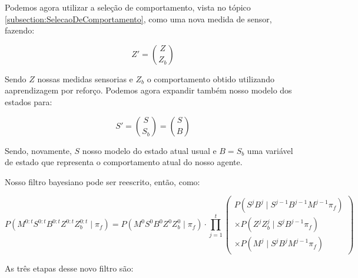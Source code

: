 Podemos agora utilizar a seleção de comportamento, vista no tópico \ref{subsection:SelecaoDeComportamento}, como uma nova medida de sensor, fazendo:

\begin{equation}
	Z' = \binom{Z}{Z_b}
\end{equation}

Sendo $ Z $ nossas medidas sensorias e $ Z_b $ o comportamento obtido utilizando aaprendizagem por reforço. Podemos agora expandir também nosso modelo dos estados para:

\begin{equation}
	S' = \binom{S}{S_b} = \binom{S}{B}
\end{equation}

Sendo, novamente, $ S $ nosso modelo do estado atual usual e $ B = S_b $ uma variável de estado que representa o comportamento atual do nosso agente.

Nosso filtro bayesiano pode ser reescrito, então, como:

\begin{equation}
        P \left( M^{0: t} S^{0: t} B^{0: t} Z^{0: t} Z_b^{0: t} \mid \pi_f \right) = P \left( M^0 S^0 B^0 Z^0 Z_b^0 \mid \pi_f \right) \cdot \prod\limits_{j =1}^{t} 
        \left(
            \begin{array}{l}
                P \left( S^j B^j \mid S^{j -1} B^{j-1} M^{j -1} \pi_f \right) \\
                \times P \left( Z^j Z_b^j \mid S^j B^{j-1} \pi_f \right) \\
                \times P \left( M^j \mid S^j B^j M^{j -1} \pi_f \right)
            \end{array}
        \right)
\end{equation}

As três etapas desse novo filtro são:

